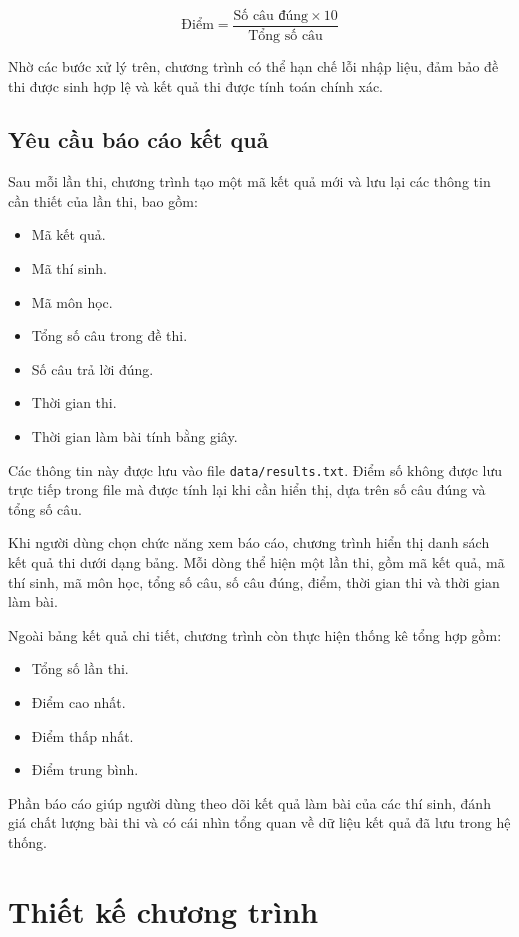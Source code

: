 \documentclass[12pt,a4paper]{report}
\begin{document}
\[
    \text{Điểm} = \frac{\text{Số câu đúng} \times 10}{\text{Tổng số câu}}
\]

Nhờ các bước xử lý trên, chương trình có thể hạn chế lỗi nhập liệu, đảm bảo đề thi được sinh hợp lệ và kết quả thi được tính toán chính xác.

\subsection{Yêu cầu báo cáo kết quả}

Sau mỗi lần thi, chương trình tạo một mã kết quả mới và lưu lại các thông tin cần thiết của lần thi, bao gồm:

\begin{itemize}
    \item Mã kết quả.
    \item Mã thí sinh.
    \item Mã môn học.
    \item Tổng số câu trong đề thi.
    \item Số câu trả lời đúng.
    \item Thời gian thi.
    \item Thời gian làm bài tính bằng giây.
\end{itemize}

Các thông tin này được lưu vào file \texttt{data/results.txt}. Điểm số không được lưu trực tiếp trong file mà được tính lại khi cần hiển thị, dựa trên số câu đúng và tổng số câu.

Khi người dùng chọn chức năng xem báo cáo, chương trình hiển thị danh sách kết quả thi dưới dạng bảng. Mỗi dòng thể hiện một lần thi, gồm mã kết quả, mã thí sinh, mã môn học, tổng số câu, số câu đúng, điểm, thời gian thi và thời gian làm bài.

Ngoài bảng kết quả chi tiết, chương trình còn thực hiện thống kê tổng hợp gồm:

\begin{itemize}
    \item Tổng số lần thi.
    \item Điểm cao nhất.
    \item Điểm thấp nhất.
    \item Điểm trung bình.
\end{itemize}

Phần báo cáo giúp người dùng theo dõi kết quả làm bài của các thí sinh, đánh giá chất lượng bài thi và có cái nhìn tổng quan về dữ liệu kết quả đã lưu trong hệ thống.

\section{Thiết kế chương trình}
\end{document}

